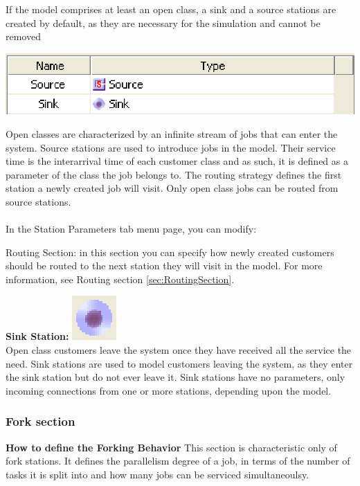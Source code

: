 \begin{enumerate*}
If the model comprises at least an open class, a sink and  a source stations are created by default, as they are necessary for the simulation and cannot be removed\\
\begin{center}
\includegraphics[scale=.5]{img/jsim/source_sink.eps}
\end{center}
Open classes are characterized by an infinite stream of jobs that can enter the system. Source stations are used to introduce jobs in the model. Their service time is the interarrival time of each customer class and as such, it is defined as a parameter of the class the job belongs to. The routing strategy defines the first station
a newly created job will visit. Only open class jobs can be routed from source stations.\\\\
In the Station Parameters tab menu page, you can modify:
\begin{description*}
\item[Routing Section:] in this section you can specify how newly created customers should be routed to the next station they will visit in the model.
For more information, see Routing section \ref{sec:RoutingSection}.
\end{description*}
\item \textbf{Sink Station:} \includegraphics[scale=1]{img/jsim/sink.eps}\\
Open class customers leave the system once they have received all the service the need. Sink stations are used to model customers leaving the system, as they
enter the sink station but do not ever leave it. Sink stations have no parameters, only incoming connections from one or more stations, depending upon the model.
\end{enumerate*}

\subsubsection{Fork section}
\label{sec:ForkSection}
\textbf{How to define the Forking Behavior}
This section is characteristic only of fork stations. It defines the parallelism degree of a job, in terms of the number of tasks it is split into and how many jobs can be serviced simultaneoulsy.

